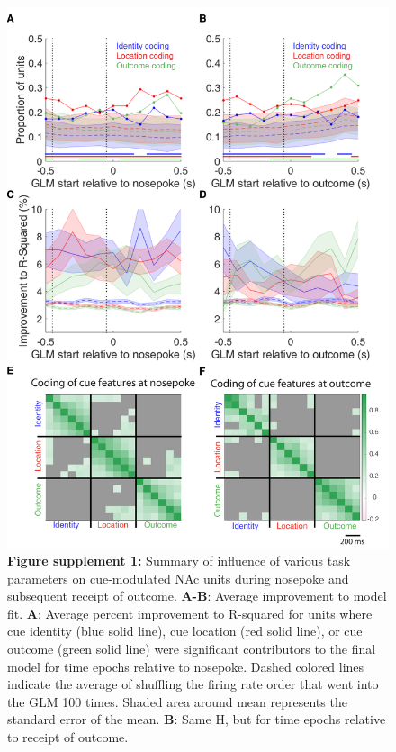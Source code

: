 \documentclass[11pt]{article}
\newcommand{\bsf}[1]{\textbf{#1}}
\begin{document}
 \begin{figure}[ht!]
\centering
\includegraphics[width=\textwidth]{Fig 8 - SUPP GLM.pdf}
\caption*{\bsf{Figure supplement 1:} Summary of influence of various task parameters on cue-modulated NAc
units during nosepoke and subsequent receipt of outcome. \bsf{A-B}: Average improvement to model fit. \bsf{A}: Average percent improvement to R-squared for units where cue identity (blue solid line), cue location (red solid line), or cue outcome (green solid line) were significant contributors to the final model for time epochs relative to nosepoke. Dashed colored lines indicate the average of shuffling the firing rate order that went into the GLM 100 times. Shaded area around mean represents the standard error of the mean. \bsf{B}: Same H, but for time epochs relative to receipt of outcome.}
\label{fig:Q2SUPP1}
\end{figure} \clearpage
\end{document}
